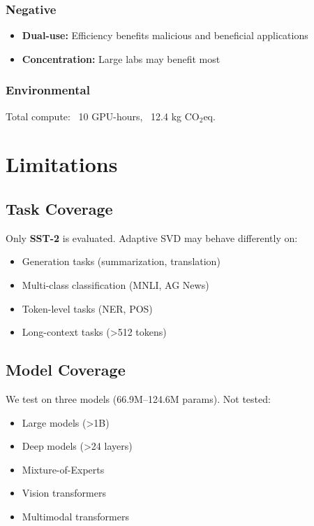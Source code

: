 \subsubsection{Negative}
\begin{itemize}
\item \textbf{Dual-use:} Efficiency benefits malicious and beneficial applications
\item \textbf{Concentration:} Large labs may benefit most

\end{itemize}
\subsubsection{Environmental}
Total compute: ~10 GPU-hours, ~12.4 kg CO$_2$eq.


\section{Limitations}

\subsection{Task Coverage}

Only \textbf{SST-2} is evaluated. Adaptive SVD may behave differently on:
\begin{itemize}
\item Generation tasks (summarization, translation)
\item Multi-class classification (MNLI, AG News)
\item Token-level tasks (NER, POS)
\item Long-context tasks (\textgreater{}512 tokens)

\end{itemize}
\subsection{Model Coverage}

We test on three models (66.9M--124.6M params). Not tested:
\begin{itemize}
\item Large models (\textgreater{}1B)
\item Deep models (\textgreater{}24 layers)
\item Mixture-of-Experts
\item Vision transformers
\item Multimodal transformers

\end{itemize}

